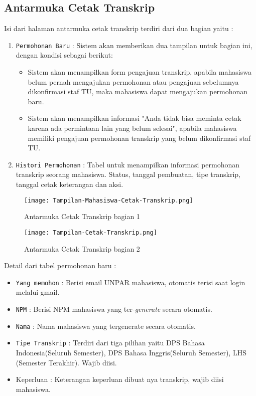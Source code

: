 \begin{enumerate}
\section{Antarmuka Cetak Transkrip}
Isi dari halaman antarmuka cetak transkrip terdiri dari dua bagian yaitu :
\begin{enumerate}
	\item \verb|Permohonan Baru| : Sistem akan memberikan dua tampilan untuk bagian ini, dengan kondisi sebagai berikut:
	\begin{itemize}
		\item Sistem akan menampilkan form pengajuan transkrip, apabila mahasiswa belum pernah mengajukan permohonan atau pengajuan sebelumnya  dikonfirmasi staf TU, maka mahasiswa dapat mengajukan permohonan baru.
		\item Sistem akan menampilkan informasi "Anda tidak bisa meminta cetak karena ada permintaan lain yang belum selesai", apabila mahasiswa memiliki pengajuan permohonan transkrip yang belum dikonfirmasi staf TU. 
	\end{itemize}
	\item \verb|Histori Permohonan| : Tabel untuk menampilkan informasi permohonan transkrip seorang mahasiswa. Status, tanggal pembuatan, tipe transkrip, tanggal cetak keterangan dan aksi. 
\end{enumerate}
\begin{figure} [H]
	\centering  
	\texttt{[image: Tampilan-Mahasiswa-Cetak-Transkrip.png]}  
	\caption{Antarmuka Cetak Transkrip bagian 1} 
\end{figure}
\begin{figure} [H]
	\centering  
	\texttt{[image: Tampilan-Cetak-Transkrip.png]}  
	\caption{Antarmuka Cetak Transkrip bagian 2} 
\end{figure}
Detail dari tabel permohonan baru :
\begin{itemize}
	\item \texttt{Yang memohon} : Berisi email UNPAR mahasiswa, otomatis terisi saat login melalui gmail.
	\item \texttt{NPM} : Berisi NPM mahasiswa yang ter-\textit{generate} secara otomatis.
	\item \texttt{Nama} : Nama mahasiswa yang tergenerate secara otomatis.
	\item \texttt{Tipe Transkrip} : Terdiri dari tiga pilihan yaitu DPS Bahasa Indonesia(Seluruh Semester), DPS Bahasa Inggris(Seluruh Semester), LHS (Semester Terakhir). Wajib diisi.
	\item Keperluan : Keterangan keperluan dibuat nya transkrip, wajib diisi mahasiswa.

\end{itemize}
\end{enumerate}
